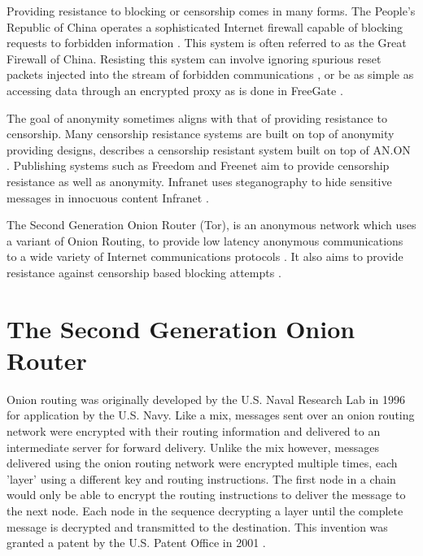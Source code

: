 \documentclass{ecuthesis}
\begin{document}
Providing resistance to blocking or censorship comes in many forms. The People's
Republic of China operates a sophisticated Internet firewall capable of blocking
requests to forbidden information \parencite{The-OpenNet-Initiative:2009uq}.
This system is often referred to as the Great Firewall of China. Resisting this
system can involve ignoring spurious reset packets injected into the stream of
forbidden communications \parencite{springerlink:10.1007/11957454_2}, or be as
simple as accessing data through an encrypted proxy as is done in FreeGate
\parencite{Smart:2008kx}.

The goal of anonymity sometimes aligns with that of providing resistance to
censorship. Many censorship resistance systems are built on top of anonymity
providing designs, \textcite{Kopsell:2004:ABR:1029179.1029197} describes a
censorship resistant system built on top of AN.ON
\parencite{springerlink:10.1007/3-540-44702-4_7}. Publishing systems such as
Freedom \parencite{Goldberg:1999p2231} and Freenet \parencite{Clarke:2001p2435}
aim to provide censorship resistance as well as anonymity. Infranet uses
steganography to hide sensitive messages in innocuous content Infranet
\parencite{Feamster:2002p307}.

The Second Generation Onion Router (Tor), is an anonymous network which uses a
variant of Onion Routing, to provide low latency anonymous communications to a
wide variety of Internet communications protocols
\parencite{Dingledine:2004p314}. It also aims to provide resistance against
censorship based blocking attempts \parencite{Dingledine:2008p1542}.

\section{The Second Generation Onion Router}

Onion routing was originally developed by the U.S. Naval Research Lab in 1996
\parencite{Goldschlag:1996wy} for application by the U.S. Navy. Like a mix,
messages sent over an onion routing network were encrypted with their routing
information and delivered to an intermediate server for forward delivery.
Unlike the mix however, messages delivered using the onion routing network were
encrypted multiple times, each 'layer' using a different key and routing
instructions. The first node in a chain would only be able to encrypt the
routing instructions to deliver the message to the next node. Each node in the
sequence decrypting a layer until the complete message is decrypted and
transmitted to the destination. This invention was granted a patent by the U.S.
Patent Office in 2001 \parencite{Michael:2001}.
\end{document}
